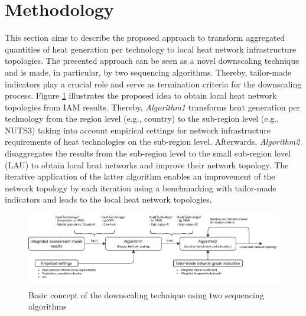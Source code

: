 \section{Methodology}
This section aims to describe the proposed approach to transform aggregated quantities of heat generation per technology to local heat network infrastructure topologies. The presented approach can be seen as a novel downscaling technique and is made, in particular, by two sequencing algorithms. Thereby, tailor-made indicators play a crucial role and serve as termination criteria for the downscaling process. Figure \ref{fig:meth1} illustrates the proposed idea to obtain local heat network topologies from IAM results. Thereby, \textit{Algorithm1} transforms heat generation per technology from the region level (e.g., country) to the sub-region level (e.g., NUTS3) taking into account empirical settings for network infrastructure requirements of heat technologies on the sub-region level. Afterwards, \textit{Algorithm2} disaggregates the results from the sub-region level to the small sub-region level (LAU) to obtain local heat networks and improve their network topology. The iterative application of the latter algorithm enables an improvement of the network topology by each iteration using a benchmarking with tailor-made indicators and leads to the local heat network topologies.\vspace{0.3cm}

\begin{figure}[h]
	\centering
	\includegraphics[width=1\linewidth]{figures/3_Methodology/Flow_diagram.png}
	\caption{Basic concept of the downscaling technique using two sequencing algorithms}
	\label{fig:meth1}
\end{figure}

